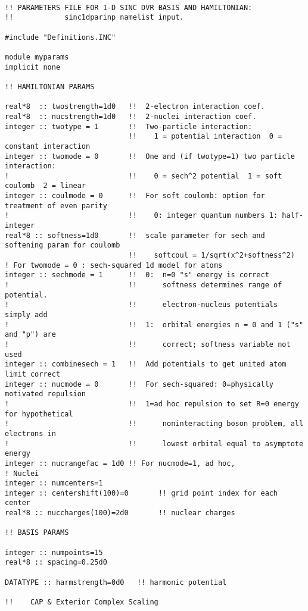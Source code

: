\begin{verbatim}

!! PARAMETERS FILE FOR 1-D SINC DVR BASIS AND HAMILTONIAN:
!!            sinc1dparinp namelist input.

#include "Definitions.INC"

module myparams
implicit none

!! HAMILTONIAN PARAMS

real*8  :: twostrength=1d0   !!  2-electron interaction coef.
real*8  :: nucstrength=1d0   !!  2-nuclei interaction coef.
integer :: twotype = 1       !!  Two-particle interaction:
                             !!    1 = potential interaction  0 = constant interaction
integer :: twomode = 0       !!  One and (if twotype=1) two particle interaction:
!                            !!    0 = sech^2 potential  1 = soft coulomb  2 = linear
integer :: coulmode = 0      !!  For soft coulomb: option for treatment of even parity
!                            !!    0: integer quantum numbers 1: half-integer
real*8 :: softness=1d0       !!  scale parameter for sech and softening param for coulomb
                             !!    softcoul = 1/sqrt(x^2+softness^2)
! For twomode = 0 : sech-squared 1d model for atoms
integer :: sechmode = 1      !!  0:  n=0 "s" energy is correct
!                            !!      softness determines range of potential.
!                            !!      electron-nucleus potentials simply add
!                            !!  1:  orbital energies n = 0 and 1 ("s" and "p") are
!                            !!      correct; softness variable not used
integer :: combinesech = 1   !!  Add potentials to get united atom limit correct
integer :: nucmode = 0       !!  For sech-squared: 0=physically motivated repulsion
!                            !!  1=ad hoc repulsion to set R=0 energy for hypothetical
!                            !!      noninteracting boson problem, all electrons in
!                            !!      lowest orbital equal to asymptote energy
integer :: nucrangefac = 1d0 !! For nucmode=1, ad hoc, 
! Nuclei
integer :: numcenters=1
integer :: centershift(100)=0       !! grid point index for each center
real*8 :: nuccharges(100)=2d0       !! nuclear charges

!! BASIS PARAMS

integer :: numpoints=15
real*8 :: spacing=0.25d0

DATATYPE :: harmstrength=0d0   !! harmonic potential

!!    CAP & Exterior Complex Scaling


\end{verbatim}
